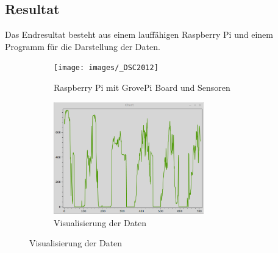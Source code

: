 \subsection*{Resultat}
Das Endresultat besteht aus einem lauffähigen Raspberry Pi und einem Programm für die Darstellung der Daten.
\begin{figure}[htb]
	\begin{subfigure}[b]{0.45\linewidth}
		\centering
		\texttt{[image: images/\_DSC2012]}
		\caption{Raspberry Pi mit GrovePi Board und Sensoren}
	\end{subfigure}
	\begin{subfigure}[b]{.45\linewidth}
		\centering
		\includegraphics[width=6.5cm]{images/resultat}
		\caption{Visualisierung der Daten}
	\end{subfigure}
\end{figure}
